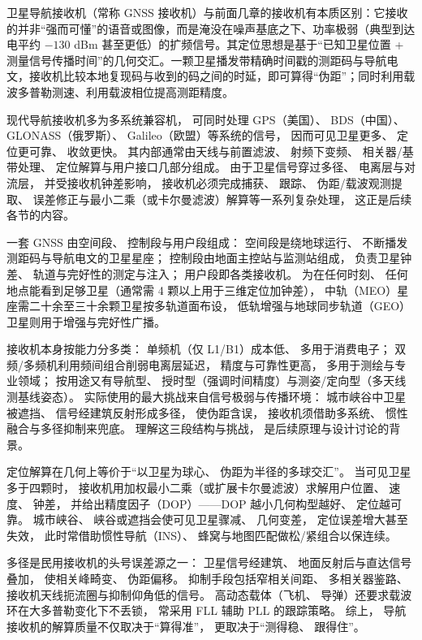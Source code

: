 卫星导航接收机（常称 GNSS 接收机）与前面几章的接收机有本质区别：它接收的并非“强而可懂”的语音或图像，而是淹没在噪声基底之下、功率极弱（典型到达电平约 $-130$ dBm 甚至更低）的扩频信号。其定位思想是基于“已知卫星位置 + 测量信号传播时间”的几何交汇。一颗卫星播发带精确时间戳的测距码与导航电文，接收机比较本地复现码与收到的码之间的时延，即可算得“伪距”；同时利用载波多普勒测速、利用载波相位提高测距精度。

现代导航接收机多为多系统兼容机，
可同时处理 GPS（美国）、
BDS（中国）、
GLONASS（俄罗斯）、
Galileo（欧盟）等系统的信号，
因而可见卫星更多、
定位更可靠、
收敛更快。
其内部通常由天线与前置滤波、
射频下变频、
相关器/基带处理、
定位解算与用户接口几部分组成。
由于卫星信号穿过多径、
电离层与对流层，
并受接收机钟差影响，
接收机必须完成捕获、
跟踪、
伪距/载波观测提取、
误差修正与最小二乘（或卡尔曼滤波）解算等一系列复杂处理，
这正是后续各节的内容。

一套 GNSS 由空间段、
控制段与用户段组成：
空间段是绕地球运行、
不断播发测距码与导航电文的卫星星座；
控制段由地面主控站与监测站组成，
负责卫星钟差、
轨道与完好性的测定与注入；
用户段即各类接收机。
为在任何时刻、
任何地点能看到足够卫星（通常需 4 颗以上用于三维定位加钟差），
中轨（MEO）星座需二十余至三十余颗卫星按多轨道面布设，
低轨增强与地球同步轨道（GEO）卫星则用于增强与完好性广播。

接收机本身按能力分多类：
单频机（仅 L1/B1）成本低、
多用于消费电子；
双频/多频机利用频间组合削弱电离层延迟，
精度与可靠性更高，
多用于测绘与专业领域；
按用途又有导航型、
授时型（强调时间精度）与测姿/定向型（多天线测基线姿态）。
实际使用的最大挑战来自信号极弱与传播环境：
城市峡谷中卫星被遮挡、
信号经建筑反射形成多径，
使伪距含误，
接收机须借助多系统、
惯性融合与多径抑制来兜底。
理解这三段结构与挑战，
是后续原理与设计讨论的背景。

定位解算在几何上等价于“以卫星为球心、
伪距为半径的多球交汇”。
当可见卫星多于四颗时，
接收机用加权最小二乘（或扩展卡尔曼滤波）求解用户位置、
速度、
钟差，
并给出精度因子（DOP）——DOP 越小几何构型越好、
定位越可靠。
城市峡谷、
峡谷或遮挡会使可见卫星骤减、
几何变差，
定位误差增大甚至失效，
此时常借助惯性导航（INS）、
蜂窝与地图匹配做松/紧组合以保连续。

多径是民用接收机的头号误差源之一：
卫星信号经建筑、
地面反射后与直达信号叠加，
使相关峰畸变、
伪距偏移。
抑制手段包括窄相关间距、
多相关器鉴路、
接收机天线扼流圈与抑制仰角低的信号。
高动态载体（飞机、
导弹）还要求载波环在大多普勒变化下不丢锁，
常采用 FLL 辅助 PLL 的跟踪策略。
综上，
导航接收机的解算质量不仅取决于“算得准”，
更取决于“测得稳、
跟得住”。

